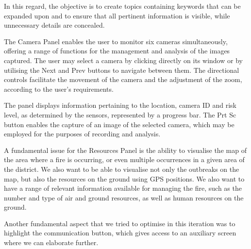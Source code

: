 In this regard, the objective is to create topics containing keywords that can be expanded upon and to ensure that all pertinent information is visible, while unnecessary details are concealed. \par
The Camera Panel enables the user to monitor six cameras simultaneously, offering a range of functions for the management and analysis of the images captured. The user may select a camera by clicking directly on its window or by utilising the Next and Prev buttons to navigate between them. The directional controls facilitate the movement of the camera and the adjustment of the zoom, according to the user's requirements. \par
The panel displays information pertaining to the location, camera ID and risk level, as determined by the sensors, represented by a progress bar. The Prt Sc button enables the capture of an image of the selected camera, which may be employed for the purposes of recording and analysis. \par
A fundamental issue for the Resources Panel is the ability to visualise the map of the area where a fire is occurring, or even multiple occurrences in a given area of the district. We also want to be able to visualise not only the outbreaks on the map, but also the resources on the ground using GPS positions. We also want to have a range of relevant information available for managing the fire, such as the number and type of air and ground resources, as well as human resources on the ground. \par
Another fundamental aspect that we tried to optimise in this iteration was to highlight the communication button, which gives access to an auxiliary screen where we can elaborate further. \par

